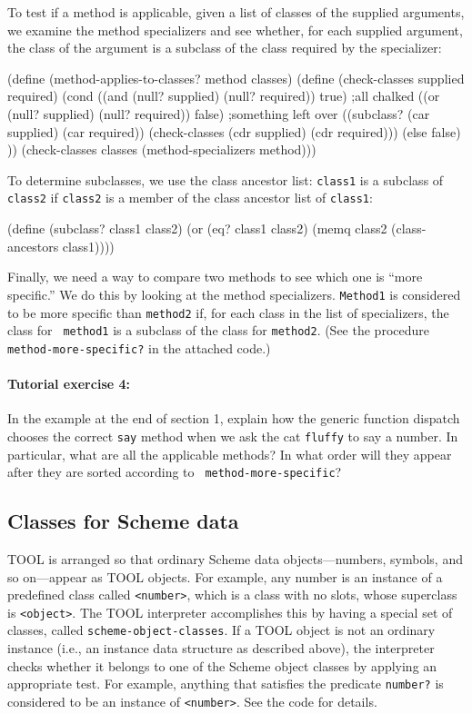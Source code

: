 To test if a method is applicable, given a list of classes of the
supplied arguments, we examine the method specializers and see
whether, for each supplied argument, the class of the argument is a
subclass of the class required by the specializer:

\beginlisp
(define (method-applies-to-classes? method classes)
  (define (check-classes supplied required)
    (cond ((and (null? supplied) (null? required)) true) ;all chalked
          ((or (null? supplied) (null? required)) false) ;something left over
          ((subclass? (car supplied) (car required))
           (check-classes (cdr supplied) (cdr required)))
          (else false)
          ))
  (check-classes classes (method-specializers method)))
\endlisp

To determine subclasses, we use the class ancestor list: {\tt class1}
is a subclass of {\tt class2} if {\tt class2} is a member of the class
ancestor list of {\tt class1}:

\beginlisp
(define (subclass? class1 class2)
  (or (eq? class1 class2)
      (memq class2 (class-ancestors class1))))
\endlisp

Finally, we need a way to compare two methods to see which one is
``more specific.''  We do this by looking at the method specializers.
{\tt Method1} is considered to be more specific than {\tt method2} if,
for each class in the list of specializers, the class for {\tt
method1} is a subclass of the class for {\tt method2}.  (See the
procedure {\tt method-more-specific?} in the attached code.)

\paragraph{Tutorial exercise 4:} In the example at the end of
section 1, explain how the generic function dispatch chooses the
correct {\tt say} method when we ask the cat {\tt fluffy} to say a
number.  In particular, what are all the applicable methods?  In what
order will they appear after they are sorted according to {\tt
method-more-specific}?


\subsection{Classes for Scheme data}

TOOL is arranged so that ordinary Scheme data objects---numbers,
symbols, and so on---appear as TOOL objects.  For example, any number
is an instance of a predefined class called {\tt <number>}, which is
a class with no slots, whose superclass is {\tt <object>}.  The TOOL
interpreter accomplishes this by having a special set of classes,
called {\tt scheme-object-classes}.  If a TOOL object is not an
ordinary instance (i.e., an instance data structure as described
above), the interpreter checks whether it belongs to one of the
Scheme object classes by applying an appropriate test.  For example,
anything that satisfies the predicate {\tt number?} is considered to
be an instance of {\tt <number>}.  See the code for details.

